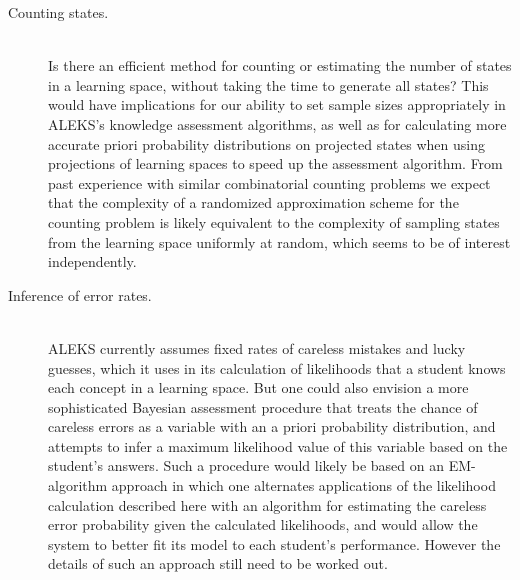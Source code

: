 \documentclass[11pt]{llncs}
\begin{document}
{\begin{description}
\item[Counting states.] \hfill\\
Is there an efficient method for counting or estimating the number of states in a learning space, without taking the time to generate all states? This would have implications for our ability to set sample sizes appropriately in ALEKS's knowledge assessment algorithms, as well as for calculating more accurate priori probability distributions on projected states when using projections of learning spaces to speed up the assessment algorithm. From past experience with similar combinatorial counting problems \citep[e.g.,][]{JerSinVig-STOC-01} we expect that the complexity of a randomized approximation scheme for the counting problem is likely equivalent to the complexity of sampling states from the learning space uniformly at random, which seems to be of interest independently.

\item[Inference of error rates.] \hfill\\
ALEKS  currently assumes fixed rates of careless mistakes and lucky guesses, which it uses in its calculation of likelihoods that a student knows each concept in a learning space. But one could also envision a more sophisticated Bayesian assessment procedure that treats the chance of careless errors as a variable with an a priori probability distribution, and attempts to infer a maximum likelihood value of this variable based on the student's answers. Such a procedure would likely be based on an EM-algorithm approach in which one alternates applications of the likelihood calculation described here with an algorithm for estimating the careless error probability given the calculated likelihoods, and would allow the system to better fit its model to each student's performance. However the details of such an approach still need to be worked out.


\end{description}}
\end{document}
